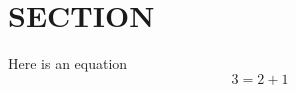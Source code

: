 \documentclass{article} %
\begin{document}
\section{SECTION}
Here is an equation
\begin{equation}
    3 = 2+1 
\label{eq321}
\end{equation}
\end{document}
